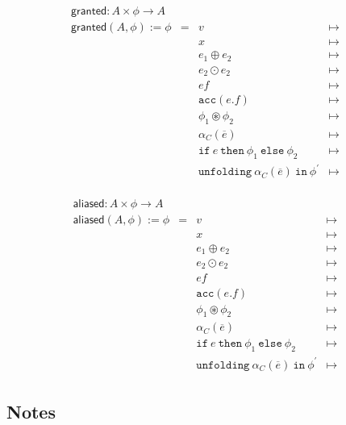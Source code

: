 \documentclass{article}
\newcommand{\tsf}{\textsf}
\newcommand{\ttt}{\texttt}
\newcommand{\mt}{\mapsto}
\newcommand{\cast}{\circledast}
\renewcommand{\vec}{\overline}
\newcommand{\p}{^\prime}
\newcommand{\cif}{\ttt{if}}
\newcommand{\cthen}{\ttt{then}}
\newcommand{\celse}{\ttt{else}}
\newcommand{\cacc}{\ttt{acc}}
\newcommand{\cunfolding}{\ttt{unfolding}}
\newcommand{\cin}{\ttt{in}}
\newcommand{\granted}{\tsf{granted}}
\newcommand{\aliased}{\tsf{aliased}}
\begin{document}
\begin{align*}
\begin{array}{rclrl}
\granted : A \times \phi \rightarrow A &&&& \\
\granted(A, \phi) := \phi & =
%
%
&     v
&\mt& %
\\
&&     x
&\mt& %
\\
&&     e_1 \oplus e_2
&\mt& %
\\
&&     e_2 \odot e_2
&\mt& %
\\
&&     ef
&\mt& %
\\
&&    \cacc(e.f)
&\mt& %
\\
&&     \phi_1 \cast \phi_2
&\mt& %
\\
&&     \alpha_C(\vec{e})
&\mt& %
\\
&&     \cif \ e \ \cthen \ \phi_1 \ \celse \ \phi_2
&\mt& %
\\
&&     \cunfolding \ \alpha_C(\vec{e}) \ \cin \ \phi\p
&\mt& %
\end{array}
\end{align*}

\begin{align*}
\begin{array}{rclrl}
\aliased : A \times \phi \rightarrow A &&&& \\
\aliased(A, \phi) := \phi & =
%
%
&     v
&\mt& %
\\
&&     x
&\mt& %
\\
&&     e_1 \oplus e_2
&\mt& %
\\
&&     e_2 \odot e_2
&\mt& %
\\
&&     ef
&\mt& %
\\
&&    \cacc(e.f)
&\mt& %
\\
&&     \phi_1 \cast \phi_2
&\mt& %
\\
&&     \alpha_C(\vec{e})
&\mt& %
\\
&&     \cif \ e \ \cthen \ \phi_1 \ \celse \ \phi_2
&\mt& %
\\
&&     \cunfolding \ \alpha_C(\vec{e}) \ \cin \ \phi\p
&\mt& %
\end{array}
\end{align*}

\subsection{Notes}
\end{document}
